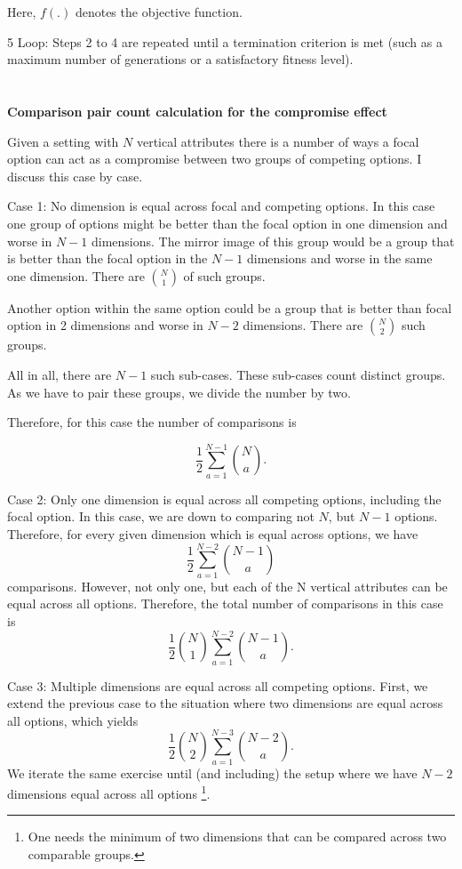 \documentclass[a4paper,12pt]{article}
\begin{document}
Here, $f(.)$ denotes the objective function.

5 Loop: Steps 2 to 4 are repeated until a termination criterion is met (such as a maximum number of generations or a satisfactory fitness level).



\clearpage
\section{}\label{appendix:compromiseCalculation}

\textbf{Comparison pair count calculation for the compromise effect}

Given a setting with $N$ vertical attributes there is a number of ways a focal option can act as a compromise between two groups of competing options.
I discuss this case by case.

Case 1: No dimension is equal across focal and competing options. In this case one group of options might be better than the focal option in one dimension and worse in $N-1$ dimensions. The mirror image of this group would be a group that is better than the focal option in the $N-1$ dimensions and worse in the same one dimension. There are $\binom{N}{1}$ of such groups.

Another option within the same option could be a group that is better than focal option in 2 dimensions and worse in $N-2$ dimensions. There are $\binom{N}{2}$ such groups. 

All in all, there are $N-1$ such sub-cases. These sub-cases count distinct groups. As we have to pair these groups, we divide the number by two.

Therefore, for this case the number of comparisons is 

$$\frac{1}{2}\sum_{a=1}^{N-1}\binom{N}{a}.$$

Case 2: Only one dimension is equal across all competing options, including the focal option. In this case, we are down to comparing not $N$, but $N-1$ options. Therefore, for every given dimension which is equal across options, we have $$\frac{1}{2}\sum_{a=1}^{N-2}\binom{N-1}{a}$$ comparisons. However, not only one, but each of the N vertical attributes can be equal across all options. Therefore, the total number of comparisons in this case is $$\frac{1}{2}\binom{N}{1}\sum_{a=1}^{N-2}{\binom{N-1}{a}.}$$

Case 3: Multiple dimensions are equal across all competing options. First, we extend the previous case to the situation where two dimensions are equal across all options, which yields $$\frac{1}{2}\binom{N}{2}\sum_{a=1}^{N-3}{\binom{N-2}{a}}.$$ We iterate the same exercise until (and including) the setup where we have $N-2$ dimensions equal across all options \footnote{One needs the minimum of two dimensions that can be compared across two comparable groups.}. 
\end{document}
